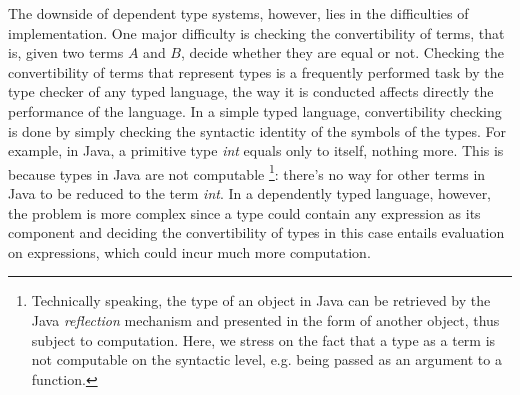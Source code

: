 The downside of dependent type systems, however, lies in the difficulties of implementation. One major difficulty is checking the convertibility of terms, that is, given two terms $A$ and $B$, decide whether they are equal or not. Checking the convertibility of terms that represent types is a frequently performed task by the type checker of any typed language, the way it is conducted affects directly the performance of the language. In a simple typed language, convertibility checking is done by simply checking the syntactic identity of the symbols of the types. For example, in Java, a primitive type \emph{int} equals only to itself, nothing more. This is because types in Java are not computable \footnote{Technically speaking, the type of an object in Java can be retrieved by the Java \emph{reflection} mechanism and presented in the form of another object, thus subject to computation. Here, we stress on the fact that a type as a term is not computable on the syntactic level, e.g. being passed as an argument to a function.}: there's no way for other terms in Java to be reduced to the term \emph{int}. In a dependently typed language, however, the problem is more complex since a type could contain any expression as its component and deciding the convertibility of types in this case entails evaluation on expressions, which could incur much more computation.

